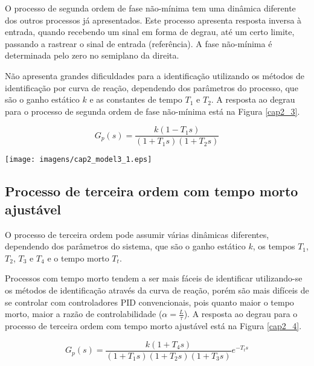     O processo de segunda ordem de fase não-mínima tem uma dinâmica diferente dos
    outros processos já apresentados. Este processo apresenta resposta inversa à
    entrada, quando recebendo um sinal em forma de degrau, até um certo limite,
    passando a rastrear o sinal de entrada (referência). A fase não-mínima é
    determinada pelo zero no semiplano da direita.
    
    Não apresenta grandes dificuldades para a identificação utilizando os métodos
    de identificação por curva de reação, dependendo dos parâmetros do processo,
    que são o ganho estático $k$ e as constantes de tempo $T_1$ e $T_2$. A resposta
    ao degrau para o processo de segunda ordem de fase não-mínima está na Figura
    \ref{cap2_3}.

    \begin{equation}
        G_p(s) = \frac{k(1-T_1 s)}{(1+T_1 s)(1+T_2 s)}
    \end{equation}

    \begin{center}
        \texttt{[image: imagens/cap2\_model3\_1.eps]}
        \label{cap2_3}
    \end{center}

\subsection{Processo de terceira ordem com tempo morto ajustável}
    
    O processo de terceira ordem pode assumir várias dinâmicas diferentes, dependendo
    dos parâmetros do sistema, que são o ganho estático $k$, os tempos $T_1$, $T_2$,
    $T_3$ e $T_4$ e o tempo morto $T_t$.
    
    Processos com tempo morto tendem a ser mais fáceis de identificar utilizando-se
    os métodos de identificação através da curva de reação, porém são mais difíceis
    de se controlar com controladores \acs{PID} convencionais, pois quanto maior
    o tempo morto, maior a razão de controlabilidade ($\alpha = \frac{L}{\tau}$).
    A resposta ao degrau para o processo de terceira ordem com tempo morto ajustável
    está na Figura \ref{cap2_4}.
    
    \begin{equation}
        G_p(s) = \frac{k(1+T_4 s)}{(1+T_1 s)(1+T_2 s)(1+T_3 s)} e^{-T_t s}
    \end{equation}
    
